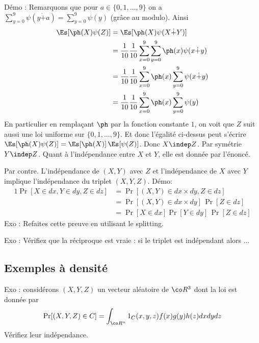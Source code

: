 \documentclass{article}
\begin{document}
Démo :   Remarquons que  pour $a\in \{0,1,...,9\}$ on a  $\sum_{y=0}^{9} \psi(y\dot +a) = \sum_{y=0}^{9} \psi(y)$ (grâce au modulo).    Ainsi
 \begin{alignat*}{1}
  \Es[\ph(X) \psi(Z)]  &= \Es[ \ph(X) \psi(X\dot +Y)] \\
  &= \frac 1 {10} \frac 1 {10} \sum_{x=0}^{9} \sum_{y =0}^{9} \ph(x) \psi(x \dot + y)  \\
    &= \frac 1 {10} \frac 1 {10} \sum_{x=0}^{9}  \ph(x)  \sum_{y =0}^{9}  \psi(x \dot + y)  \\
        &= \frac 1 {10} \frac 1 {10} \sum_{x=0}^{9}  \ph(x)  \sum_{y =0}^{9}  \psi( y)  \\
 \end{alignat*}
 En particulier en remplaçant $\ph$ par la fonction constante $1$, on voit que $Z$ suit aussi une loi uniforme sur $\{0,1,...,9\}$.   Et donc l'égalité ci-dessus peut s'écrire 
 $
 \Es[\ph(X) \psi(Z)] =\Es[\ph(X)] \, \Es[ \psi(Z)] 
 $.
 Donc $X \indep Z$.  Par symétrie $Y\indep Z$. Quant à l'indépendance entre $X$ et $Y$, elle est donnée par l'énoncé. \carre
 
 
 

Par contre. L'indépendance de  $(X,Y)$ avec $Z$ et l'indépendance de $X$ avec $Y$ implique l'indépendance du triplet $(X,Y,Z)$. Démo:
\begin{alignat*}{1}
\Pr[ X\in dx , Y\in dy, Z\in dz  ]&= \Pr[ (X,Y) \in dx\times dy ,  Z\in dz ] \\
&= \Pr[ (X,Y) \in dx\times dy] \, \Pr[  Z\in dz ] \\
&= \Pr[X\in dx] \Pr[Y\in dy] \, \Pr[  Z\in dz ] 
\end{alignat*}
Exo :    Refaites cette preuve en utilisant le splitting.  


\vspace{2cm}


Exo : Vérifiez que la réciproque est vraie : si le triplet est indépendant alors ... 



\vspace{2cm}



\subsection{ Exemples à densité}


Exo : considérons $(X,Y,Z)$ un vecteur aléatoire de $\co R^3$ dont la loi est donnée par
$$
\Pr[(X,Y,Z) \in C] = \int_{\co R^n}  1_C (x,y,z)  f(x)g(y) h(z) dx dy dz
$$
Vérifiez leur indépendance. 
\end{document}
